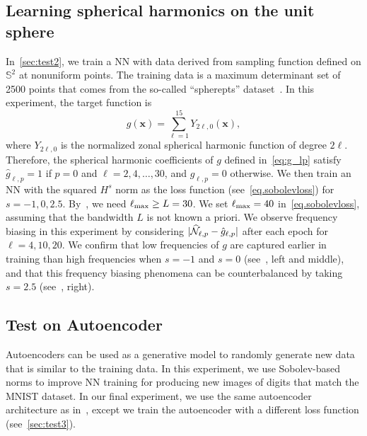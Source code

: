 \subsection{Learning spherical harmonics on the unit sphere}
In~\cref{sec:test2}, we train a NN with data derived from sampling function defined on $\mathbb{S}^2$ at nonuniform points. The training data is a maximum determinant set of 2500 points that comes from the so-called ``spherepts'' dataset~\citep{wright2015}. In this experiment, the target function is
\[
    g(\mathbf{x}) = \sum_{\ell=1}^{15} Y_{2\ell,0}(\mathbf{x}),
\]
where $Y_{2\ell, 0}$ is the normalized zonal spherical harmonic function of degree $2\ell$. Therefore, the spherical harmonic coefficients of $g$ defined in~\cref{eq:g_lp} satisfy $\hat{g}_{\ell,p} = 1$ if $p = 0$ and $\ell = 2, 4, \ldots, 30$, and $\hat{g}_{\ell,p} = 0$ otherwise. We then train an NN with the squared $H^s$ norm as the loss function (see~\cref{eq.sobolevloss}) for $s= -1, 0, 2.5$. By~, we need $\ell_{\text{max}} \geq L = 30$. We set $\ell_{\text{max}} = 40$ in~\cref{eq.sobolevloss}, assuming that the bandwidth $L$ is not known a priori.
We observe frequency biasing in this experiment by considering $|\widehat{{\mathcal{N}}}_{\ell,p} - \hat{g}_{\ell,p}|$ after each epoch for $\ell = 4,10,20$. We confirm that low frequencies of $g$ are captured earlier in training than high frequencies when $s = -1$ and $s = 0$ (see~, left and middle), and that this frequency biasing phenomena can be counterbalanced by taking $s = 2.5$ (see~, right).


\subsection{Test on Autoencoder}
Autoencoders can be used as a generative model to randomly generate new data that is similar to the training data. In this experiment, we use Sobolev-based norms to improve NN training for producing new images of digits that match the MNIST dataset.  In our final experiment, we use the same autoencoder architecture as in~\citep{autoencoder}, except we train the autoencoder with a different loss function (see~\cref{sec:test3}). 

